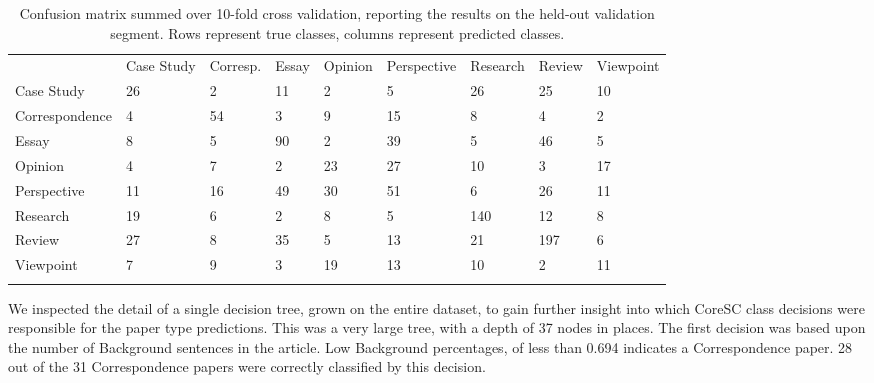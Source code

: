 \documentclass{svmult}
\begin{document}
\begin{table}

\caption{Confusion matrix summed over 10-fold cross validation, reporting the results on the held-out validation segment. Rows represent true classes, columns represent predicted classes.}
\label{tab:confusion}       %

\begin{tabular}{lllllllll}
\hline\noalign{\smallskip}
      &  Case Study   &     Corresp.      &   Essay  & Opinion &     Perspective    &     Research    &     Review  & Viewpoint \\
\noalign{\smallskip}\svhline\noalign{\smallskip}
Case Study    &    26   &     2     &   11    &    2  &      5 & 26       & 25 &       10 \\
Correspondence  &      4  &      54   &     3    &    9     &   15 & 8   &     4 &       2 \\
Essay      &  8     &   5    &   90    &    2 &       39      &  5 & 46    &    5 \\
Opinion    &    4   &     7 &       2   &     23      &  27     &   10   &  3  &      17 \\
Perspective &       11  &      16    &    49       & 30      &  51 & 6      &  26    &   11 \\
Research      &  19    &    6 &       2 &       8    &    5      &  140  &   12    &    8\\
Review       & 27     &   8     &   35    &    5      &  13    &    21   &  197 &       6\\
Viewpoint    &    7  &      9   &     3     &   19     &   13 & 10     &   2  &      11 \\
\noalign{\smallskip}\hline\noalign{\smallskip}
\end{tabular}
\end{table}




We inspected the detail of a single decision tree, grown on the entire dataset,
to gain further insight into which CoreSC class decisions were responsible for
the paper type predictions. This was a very large tree, with a depth of 37
nodes in places.  The first decision was based upon the number of Background
sentences in the article. Low Background percentages, of less than 0.694
indicates a Correspondence paper. 28 out of the 31 Correspondence papers were
correctly classified by this decision.
\end{document}
